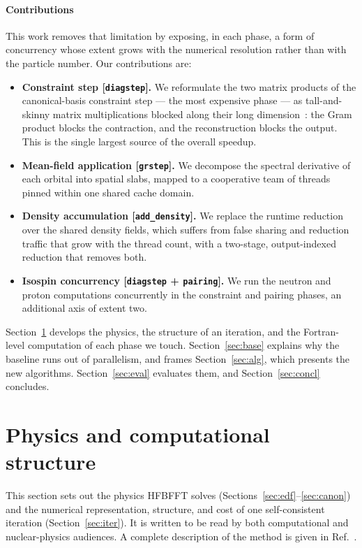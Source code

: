 \documentclass[preprint,12pt]{elsarticle}
\numberwithin{equation}{section}
\begin{document}
\paragraph{Contributions}
This work removes that limitation by exposing, in each phase, a form of concurrency whose extent grows with the numerical resolution rather than with the particle number. Our contributions are:
\begin{itemize}
\item \textbf{Constraint step [\texttt{diagstep}].} We reformulate the two matrix products of the canonical-basis constraint step --- the most expensive phase --- as tall-and-skinny matrix multiplications blocked along their long dimension~\cite{ballard2011}: the Gram product blocks the contraction, and the reconstruction blocks the output. This is the single largest source of the overall speedup.
\item \textbf{Mean-field application [\texttt{grstep}].} We decompose the spectral derivative of each orbital into spatial slabs, mapped to a cooperative team of threads pinned within one shared cache domain.
\item \textbf{Density accumulation [\texttt{add\_density}].} We replace the runtime reduction over the shared density fields, which suffers from false sharing and reduction traffic that grow with the thread count, with a two-stage, output-indexed reduction that removes both.
\item \textbf{Isospin concurrency [\texttt{diagstep} + \texttt{pairing}].} We run the neutron and proton computations concurrently in the constraint and pairing phases, an additional axis of extent two.
\end{itemize}

Section~\ref{sec:phys} develops the physics, the structure of an iteration, and the Fortran-level computation of each phase we touch. Section~\ref{sec:base} explains why the baseline runs out of parallelism, and frames Section~\ref{sec:alg}, which presents the new algorithms. Section~\ref{sec:eval} evaluates them, and Section~\ref{sec:concl} concludes.

\section{Physics and computational structure}\label{sec:phys}

This section sets out the physics HFBFFT solves (Sections~\ref{sec:edf}--\ref{sec:canon}) and the numerical representation, structure, and cost of one self-consistent iteration (Section~\ref{sec:iter}). It is written to be read by both computational and nuclear-physics audiences. A complete description of the method is given in Ref.~\cite{hfbfft}.
\end{document}
